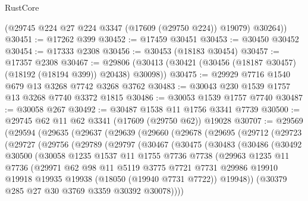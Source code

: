 \begin{lexlean}{RustCore}
\begin{coremodule}
        (@29745 @224 @27 @224 @3347 (@17609 (@29750 @224)) @19079)
        @30264))
@30451 := @17262 @399
@30452 := @17459 @30451
@30453 := @30450 @30452
@30454 := @17333 @2308
@30456 := @30453 (@18183 @30454)
@30457 := @17357 @2308
@30467 := @29806 (@30413 (@30421 (@30456 (@18187 @30457) (@18192 (@18194 @399)) @20438) @30098))
@30475 := @29929 @7716 @1540 @679 @13 @3268 @7742 @3268 @3762
@30483 := @30043 @230 @1539 @1757 @13 @3268 @7740 @3372 @1815
@30486 := @30053 @1539 @1757 @7740
@30487 := @30058 @267
@30492 := @30487 @1538 @11 @1756 @3341 @7739
@30500 := @29745 @62 @11 @62 @3341 (@17609 (@29750 @62)) @19028
@30707 := @29569
    (@29594
      (@29635
        (@29637
          (@29639
            (@29660
              (@29678
                (@29695
                  (@29712
                    (@29723
                      (@29727
                        (@29756
                          (@29789
                            (@29797
                              (@30467
                                (@30475
                                  (@30483
                                    (@30486
                                      (@30492
                                        @30500
                                        (@30058
                                          @1235
                                          @1537
                                          @11
                                          @1755
                                          @7736
                                          @7738
                                          (@29963
                                            @1235
                                            @11
                                            @7736
                                            (@29971
                                              @62
                                              @98
                                              @11
                                              @5119
                                              @3775
                                              @7721
                                              @7731
                                              @29986
                                              @19910
                                              @19918
                                              @19935
                                              @19938
                                              (@18050 (@19940 @7731 @7722))
                                              @19948))
                                          (@30379 @285 @27 @30 @3769 @3359 @30392 @30078))))

\end{coremodule}
\end{lexlean}
